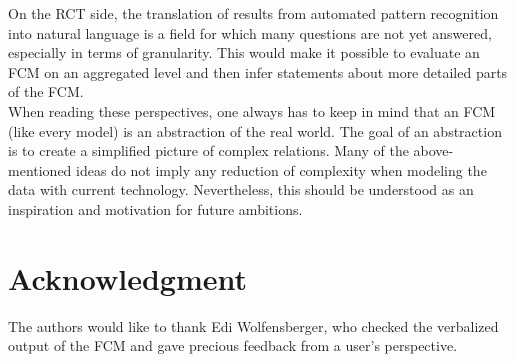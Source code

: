\documentclass[conference]{IEEEtran}
\begin{document}
On the RCT side, the translation of results from automated pattern recognition into natural language is a field for which many questions are not yet answered, especially in terms of granularity. This would make it possible to evaluate an FCM on an aggregated level and then infer statements about more detailed parts of the FCM.\\
When reading these perspectives, one always has to keep in mind that an FCM (like every model) is an abstraction of the real world. The goal of an abstraction is to create a simplified picture of complex relations. Many of the above-mentioned ideas do not imply any reduction of complexity when modeling the data with current technology. Nevertheless, this should be understood as an inspiration and motivation for future ambitions.

\section*{Acknowledgment}
The authors would like to thank Edi Wolfensberger, who checked the verbalized output of the FCM and gave precious feedback from a user's perspective.



\end{document}
